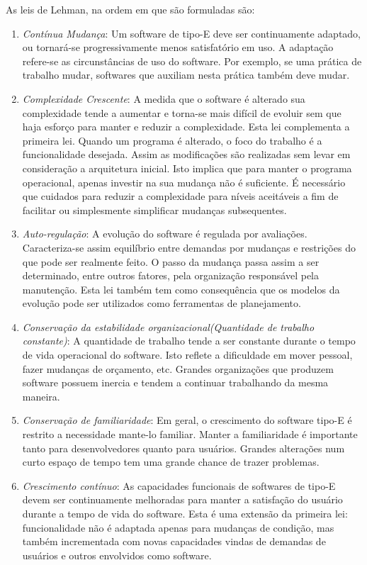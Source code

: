 As leis de Lehman, na ordem em que são formuladas são:
\begin{enumerate}
	\item \textit{Contínua Mudança}: Um software de tipo-E deve ser continuamente adaptado, ou tornará-se progressivamente menos satisfatório em uso. A adaptação refere-se as circunstâncias de uso do software. Por exemplo, se uma prática de trabalho mudar, softwares que auxiliam nesta prática também deve mudar. 
	\item \textit{Complexidade Crescente}: A medida que o software é alterado sua complexidade tende a aumentar e torna-se mais difícil de evoluir sem que haja esforço para manter e reduzir a complexidade. Esta lei complementa a primeira lei. Quando um programa é alterado, o foco do trabalho é a funcionalidade desejada. Assim as modificações são realizadas sem levar em consideração a arquitetura inicial. Isto implica que para manter o programa operacional, apenas investir na sua mudança não é suficiente. É necessário que cuidados para reduzir a complexidade para níveis aceitáveis a fim de facilitar ou simplesmente simplificar mudanças subsequentes.
	\item \textit{Auto-regulação}: A evolução do software é regulada por avaliações. Caracteriza-se assim equilíbrio entre demandas por mudanças e restrições do que pode ser realmente feito. O passo da mudança passa assim a ser determinado, entre outros fatores, pela organização responsável pela manutenção. Esta lei também tem como consequência que os modelos da evolução pode ser utilizados como ferramentas de planejamento.
	\item \textit{Conservação da estabilidade organizacional(Quantidade de trabalho constante)}: A quantidade de trabalho tende a ser constante durante o tempo de vida operacional do software. Isto reflete a dificuldade em mover pessoal, fazer mudanças de orçamento, etc. Grandes organizações que produzem software possuem inercia e tendem a continuar trabalhando da mesma maneira. 
	\item \textit{Conservação de familiaridade}: Em geral, o crescimento do software tipo-E é restrito a necessidade mante-lo familiar. Manter a familiaridade é importante tanto para desenvolvedores quanto para usuários. Grandes alterações num curto espaço de tempo tem uma grande chance de trazer problemas.
	\item \textit{Crescimento contínuo}: As capacidades funcionais de softwares de tipo-E devem ser continuamente melhoradas para manter a satisfação do usuário durante a tempo de vida do software. Esta é uma extensão da primeira lei: funcionalidade não é adaptada apenas para mudanças de condição, mas também incrementada com novas capacidades vindas de demandas de usuários e outros envolvidos como software.

\end{enumerate}
